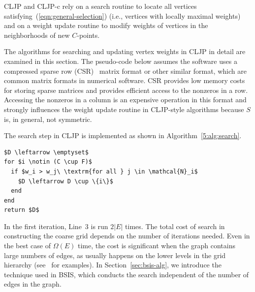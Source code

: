 \documentclass{elsart}
\begin{document}
CLJP and CLJP-c rely on a search routine to locate all vertices
satisfying~(\ref{eqn:general-selection}) (i.e., vertices with locally
maximal weights) and on a weight update routine to modify weights of
vertices in the neighborhoods of new $C$-points.

The algorithms for searching and updating vertex weights in CLJP in
detail are examined in this section. The pseudo-code below assumes the
software uses a compressed sparse row (CSR)~\cite{saadBook} matrix
format or other similar format, which are common matrix formats in
numerical software. CSR provides low memory costs for storing sparse
matrices and provides efficient access to the nonzeros in a
row. Accessing the nonzeros in a column is an expensive operation in
this format and strongly influences the weight update routine in
CLJP-style algorithms because $S$ is, in general, not symmetric.

The search step in CLJP is implemented as shown in
Algorithm~\ref{5:alg:search}.
\begin{lstlisting}[caption={Coarse-Grid Selection Graph Search},label=5:alg:search]
%\textsc{Search-Graph}$(S,\, C,\, F)$%
$D \leftarrow \emptyset$
for $i \notin (C \cup F)$
  if $w_i > w_j\ \textrm{for all } j \in \mathcal{N}_i$
    $D \leftarrow D \cup \{i\}$
  end
end
return $D$
\end{lstlisting}
In the first iteration, Line~3 is run $2|E|$ times. The total cost of
search in constructing the coarse grid depends on the number of
iterations needed. Even in the best case of $\Omega(E)$ time, the cost
is significant when the graph contains large numbers of edges, as
usually happens on the lower levels in the grid hierarchy
(see~\cite{alber-PCGS} for examples). In Section~\ref{sec:bsis-alg},
we introduce the technique used in BSIS, which conducts the search
independent of the number of edges in the graph.
\end{document}
